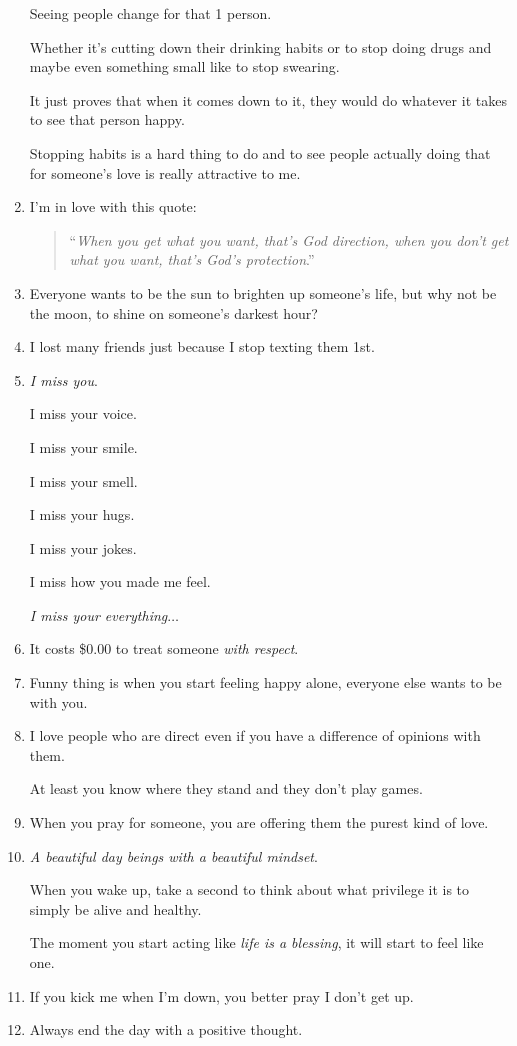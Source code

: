 \documentclass{article}
\begin{document}
\begin{enumerate}
	Seeing people change for that 1 person.
	
	Whether it's cutting down their drinking habits or to stop doing drugs and maybe even something small like to stop swearing.
	
	It just proves that when it comes down to it, they would do whatever it takes to see that person happy.
	
	Stopping habits is a hard thing to do and to see people actually doing that for someone's love is really attractive to me.
	\item I'm in love with this quote:
	\begin{quotation}
		``\textit{When you get what you want, that's God direction, when you don't get what you want, that's God's protection}.''
	\end{quotation}
	\item Everyone wants to be the sun to brighten up someone's life, but why not be the moon, to shine on someone's darkest hour?
	\item I lost many friends just because I stop texting them 1st.
	\item \textit{I miss you}.
	
	I miss your voice.
	
	I miss your smile.
	
	I miss your smell.
	
	I miss your hugs.
	
	I miss your jokes.
	
	I miss how you made me feel.
	
	\textit{I miss your everything}$\ldots$
	\item It costs \$0.00 to treat someone \textit{with respect}.
	\item Funny thing is when you start feeling happy alone, everyone else wants to be with you.
	\item I love people who are direct even if you have a difference of opinions with them.
	
	At least you know where they stand and they don't play games.
	\item When you pray for someone, you are offering them the purest kind of love.
	\item \textit{A beautiful day beings with a beautiful mindset}.
	
	When you wake up, take a second to think about what privilege it is to simply be alive and healthy.
	
	The moment you start acting like \textit{life is a blessing}, it will start to feel like one.
	\item If you kick me when I'm down, you better pray I don't get up.
	\item Always end the day with a positive thought.
	

\end{enumerate}
\end{document}
